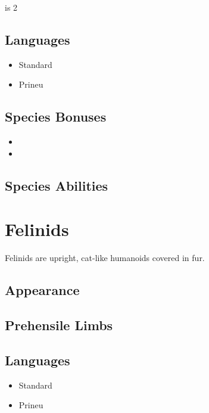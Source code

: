 { is 2

\subsection*{Languages}

\begin{itemize}
	\item Standard
	\item Prineu
\end{itemize}

\subsection*{Species Bonuses}

\begin{itemize}
	\item {}
	\item {}
\end{itemize}

\subsection*{Species Abilities}

\GRPpagebreak
\section{Felinids}

Felinids are upright, cat-like humanoids covered in fur.

\subsection*{Appearance}

\subsection*{Prehensile Limbs}

\subsection*{Languages}

\begin{itemize}
	\item Standard
	\item Prineu
\end{itemize}

}
